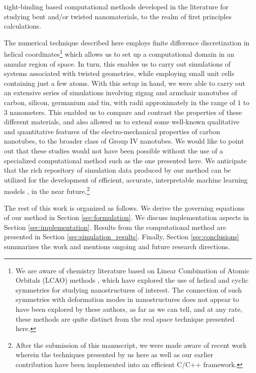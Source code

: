 \documentclass[preprint,12pt, 3p, sort&compress]{elsarticle}
\begin{document}
tight-binding based computational methods developed in the literature for studying bent and/or twisted nanomaterials, to the realm of first principles calculations.

The numerical technique described here employs finite difference discretization in helical coordinates\footnote{We are aware of chemistry literature based on Linear Combination of Atomic Orbitals (LCAO) methods \citep{d2009single, dovesi2017crystal17, Mintmire_White1, CNT_1, CRYSTAL, CNT_4}, which have explored the use of helical and cyclic symmetries for studying nanostructures of interest. The connection of such symmetries with deformation modes in nanostructures does not appear to have been explored by these authors, as far as we can tell, and at any rate, these methods are quite distinct from the real space technique presented here.} which allows us to set up a computational domain in an annular region of space. In turn, this enables us to carry out simulations of systems associated with twisted geometries, while employing small unit cells containing just a few atoms. With this setup in hand, we were able to carry out an extensive series of simulations involving zigzag and armchair nanotubes of carbon, silicon, germanium and tin, with radii approximately in the range of $1$ to $3$ nanometers. This enabled us to compare and contrast the properties of these different materials, and also allowed us to extend some well-known qualitative and quantitative features of the electro-mechanical properties of carbon nanotubes, to the broader class of Group IV nanotubes. We would like to point out that these studies would not have been possible without the use of a specialized computational method such as the one presented here. We anticipate that the rich repository of simulation data produced by our method can be utilized for the development of efficient, accurate, interpretable machine learning models  \citep{yadav2021interpretable}, in the near future.\footnote{After the submission of this manuscript, we were made aware of recent work \citep{sharma2021real} wherein the techniques presented by us here as well as our  earlier contribution \citep{banerjee2021ab} have been implemented into an efficient C/C++ framework.}

The rest of this work is organized as follows. We derive the governing equations of our method in Section \ref{sec:formulation}. We discuss implementation aspects in Section \ref{sec:implementation}. Results from the computational method are presented in Section \ref{sec:simulation_results}. Finally, Section \ref{sec:conclusions} summarizes the work and mentions ongoing and future research directions.
\end{document}
